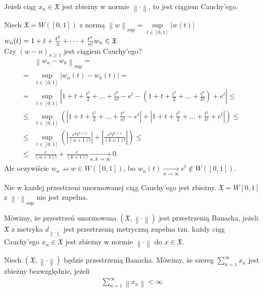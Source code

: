 \begin{twr}
Jeżeli ciąg $ x_n\in\mathfrak X  $ jest zbieżny w normie $ \left\|\cdot \right\| $, to jest ciągiem Cauchy'ego.
\end{twr}
\begin{prz}
Niech $ \mathfrak X = W\left([0,1]\right) $ z normą $ \left\|w\right\| _{\sup}=\sup\limits_{t\in[0,1]}\left|w(t)\right|$ \\
$ w_n(t)=1+t+\frac{t^2}{2}+\dots+\frac{t^n}{n!} \\
w_n\in\mathfrak X $\\
Czy $ (w-n)_{n\ge 1} $ jest ciągiem Cauchy'ego?
\begin{align*}
&\left\|w_n-w_k\right\|_{\sup}
=\\=&
\sup_{t\in[0,1]}\left|w_n(t)-w_k(t)\right|
=\\=&
\sup_{t\in [0,1]}\left|1+t+\frac{t^2}{2}+\dots+\frac{t^n}{n!} -e^t-\left(1+t+\frac{t^2}{2}+\dots+\frac{t^k}{k!} \right)+e^t\right|
\le\\\le&
\sup_{t\in [0,1]} \left(\left|1+t+\frac{t^2}{2}+\dots+\frac{t^n}{n!} -e^t\right|+\left|1+t+\frac{t^2}{2}+\dots+\frac{t^k}{k!} +e^t\right|\right)
\le\\\le&
\sup_{t\in [0,1]} \left(\left|\frac{e^\theta t^{n+1}}{(n+1)!}\right|+\left|\frac{e^{\tilde\theta} t^{k+1}}{(k+1)!}\right|\right)
\le\\\le&
\frac{e}{(n+1)!}+\frac{e}{(k+1)!}\xrightarrow[n,k\to\infty ]{}0.
\end{align*}
Ale oczywiście $ w_n\nrightarrow w\in W\left([0,1]\right)$, bo $ w_n(t)\xrightarrow[n\to\infty ]{}e^t\notin W\left([0,1]\right) $.
\end{prz}
Nie w każdej przestrzeni unormowanej ciąg Cauchy'ego jest zbieżny. $ \mathfrak X=W[0,1] $ z $ \left\|\cdot \right\|_{\sup} $ nie jest zupełna.
\begin{defi}
Mówimy, że przestrzeń unormowana $ \left(\mathfrak X,\left\|\cdot \right\|\right) $ jest przestrzenią Banacha, jeżeli $ \mathfrak X $ z metryka $ d_{\left\|\cdot \right\|} $ jest przestrzenią metryczną zupełna tzn. każdy ciąg Cauchy'ego $ x_n\in\mathfrak X $ jest zbieżny w normie $ \left\|\cdot \right\| $ do $ x\in \mathfrak X $.
\end{defi}
\begin{defi}
Niech $ \left(\mathfrak X,\left\|\cdot \right\|\right) $ będzie przestrzenią Banacha. Mówimy, że szereg $ \sum_{n=1}^{\infty }x_n $ jest zbieżny bezwzględnie, jeżeli
\begin{gather*}
\sum_{n=1}^{\infty }\left\|x_n\right\|<\infty 
\end{gather*}
\end{defi}
